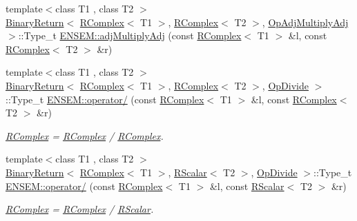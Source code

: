 \begin{DoxyCompactItemize}
\item 
{\footnotesize template$<$class T1 , class T2 $>$ }\\\mbox{\hyperlink{structENSEM_1_1BinaryReturn}{Binary\+Return}}$<$ \mbox{\hyperlink{classENSEM_1_1RComplex}{R\+Complex}}$<$ T1 $>$, \mbox{\hyperlink{classENSEM_1_1RComplex}{R\+Complex}}$<$ T2 $>$, \mbox{\hyperlink{structENSEM_1_1OpAdjMultiplyAdj}{Op\+Adj\+Multiply\+Adj}} $>$\+::Type\+\_\+t \mbox{\hyperlink{group__rcomplex_gac9d1c7be9449dc3fbb0a17d63a51dc17}{E\+N\+S\+E\+M\+::adj\+Multiply\+Adj}} (const \mbox{\hyperlink{classENSEM_1_1RComplex}{R\+Complex}}$<$ T1 $>$ \&l, const \mbox{\hyperlink{classENSEM_1_1RComplex}{R\+Complex}}$<$ T2 $>$ \&r)
\item 
{\footnotesize template$<$class T1 , class T2 $>$ }\\\mbox{\hyperlink{structENSEM_1_1BinaryReturn}{Binary\+Return}}$<$ \mbox{\hyperlink{classENSEM_1_1RComplex}{R\+Complex}}$<$ T1 $>$, \mbox{\hyperlink{classENSEM_1_1RComplex}{R\+Complex}}$<$ T2 $>$, \mbox{\hyperlink{structENSEM_1_1OpDivide}{Op\+Divide}} $>$\+::Type\+\_\+t \mbox{\hyperlink{group__rcomplex_ga60f2bd381cb984f9f438b894a2aef66f}{E\+N\+S\+E\+M\+::operator/}} (const \mbox{\hyperlink{classENSEM_1_1RComplex}{R\+Complex}}$<$ T1 $>$ \&l, const \mbox{\hyperlink{classENSEM_1_1RComplex}{R\+Complex}}$<$ T2 $>$ \&r)
\begin{DoxyCompactList}\small\item\em \mbox{\hyperlink{classENSEM_1_1RComplex}{R\+Complex}} = \mbox{\hyperlink{classENSEM_1_1RComplex}{R\+Complex}} / \mbox{\hyperlink{classENSEM_1_1RComplex}{R\+Complex}}. \end{DoxyCompactList}\item 
{\footnotesize template$<$class T1 , class T2 $>$ }\\\mbox{\hyperlink{structENSEM_1_1BinaryReturn}{Binary\+Return}}$<$ \mbox{\hyperlink{classENSEM_1_1RComplex}{R\+Complex}}$<$ T1 $>$, \mbox{\hyperlink{classENSEM_1_1RScalar}{R\+Scalar}}$<$ T2 $>$, \mbox{\hyperlink{structENSEM_1_1OpDivide}{Op\+Divide}} $>$\+::Type\+\_\+t \mbox{\hyperlink{group__rcomplex_ga249a0c4eb26560012c5090b615fadf26}{E\+N\+S\+E\+M\+::operator/}} (const \mbox{\hyperlink{classENSEM_1_1RComplex}{R\+Complex}}$<$ T1 $>$ \&l, const \mbox{\hyperlink{classENSEM_1_1RScalar}{R\+Scalar}}$<$ T2 $>$ \&r)
\begin{DoxyCompactList}\small\item\em \mbox{\hyperlink{classENSEM_1_1RComplex}{R\+Complex}} = \mbox{\hyperlink{classENSEM_1_1RComplex}{R\+Complex}} / \mbox{\hyperlink{classENSEM_1_1RScalar}{R\+Scalar}}. \end{DoxyCompactList}\item 

\end{DoxyCompactItemize}
